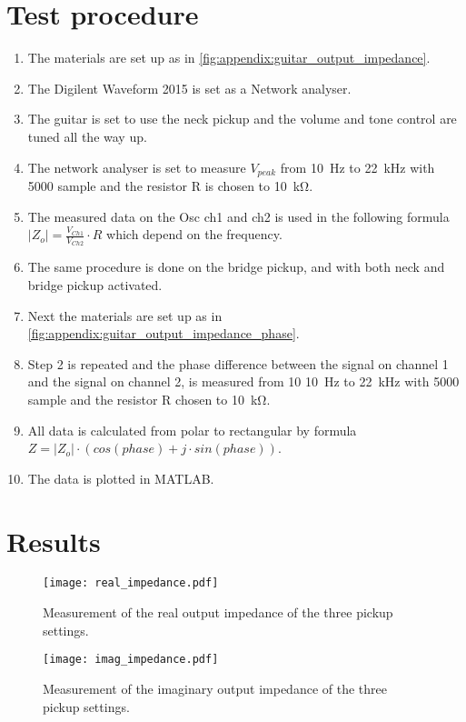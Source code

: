\newpage

\section*{Test procedure}


\begin{enumerate}
\item The materials are set up as in \autoref{fig:appendix:guitar_output_impedance}.
\item The Digilent Waveform 2015 is set as a Network analyser.
\item  The guitar is set to use the neck pickup and the volume and tone control are tuned all the way up.
\item  The network analyser is set to measure $V_{peak}$ from \SI{10}{\hertz} to \SI{22}{\kilo\hertz} with 5000 sample and the resistor R is chosen to \SI{10}{\kilo\ohm}.
\item The measured data on the Osc ch1 and ch2 is used in the following formula $\left | Z_o \right | = \frac{V_{Ch1}}{V_{Ch2}}\cdot R$ which depend on the frequency. 
\item The same procedure is done on the bridge pickup, and with both neck and bridge pickup activated.
\item Next the materials are set up as in \autoref{fig:appendix:guitar_output_impedance_phase}.
\item Step 2 is repeated and the  phase difference between the signal on channel 1 and the signal on channel 2, is measured from 10 \SI{10}{\hertz} to \SI{22}{\kilo\hertz} with 5000 sample and the resistor R chosen to \SI{10}{\kilo\ohm}.
\item All data is calculated from polar to rectangular by formula $Z=\left | Z_o \right | \cdot (cos(phase) + j \cdot sin(phase))$.
\item The data is plotted in MATLAB.
\end{enumerate}

\newpage
\section*{Results}

\begin{figure}[htbp!]
	\centering
		\texttt{[image: real\_impedance.pdf]}
		\caption{Measurement of the real output impedance of the three pickup settings.}
		\label{fig:appendix:real_impedance}
		\texttt{[image: imag\_impedance.pdf]}
		\caption{Measurement of the imaginary output impedance of the three pickup settings.}
		\label{fig:appendix:imaginary_impedance}
\end{figure}


